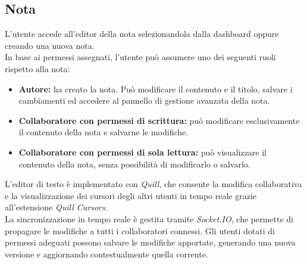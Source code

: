 \documentclass[11pt]{article}
\begin{document}
\subsection{Nota}
L’utente accede all'editor della nota selezionandola dalla dashboard oppure creando una nuova nota. \\
In base ai permessi assegnati, l’utente può assumere uno dei seguenti ruoli rispetto alla nota:
\begin{itemize}
    \item \textbf{Autore:} ha creato la nota. Può modificare il contenuto e il titolo, salvare i cambiamenti ed accedere al pannello di gestione avanzata della nota.
    \item \textbf{Collaboratore con permessi di scrittura:} può modificare esclusivamente il contenuto della nota e salvarne le modifiche.
    \item \textbf{Collaboratore con permessi di sola lettura:} può visualizzare il contenuto della nota, senza possibilità di modificarlo o salvarlo.
\end{itemize}
L’editor di testo è implementato con \textit{Quill}, che consente la modifica collaborativa e la visualizzazione dei cursori degli altri utenti in tempo reale grazie all’estensione \textit{Quill Cursors}. \\
La sincronizzazione in tempo reale è gestita tramite \textit{Socket.IO}, che permette di propagare le modifiche a tutti i collaboratori connessi. Gli utenti dotati di permessi adeguati possono salvare le modifiche apportate, generando una nuova versione e aggiornando contestualmente quella corrente.
\end{document}
